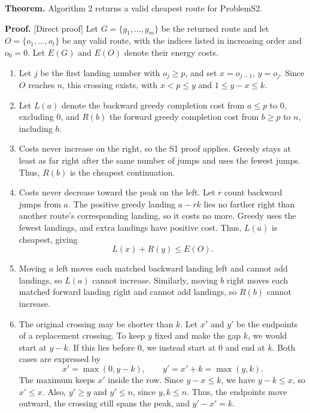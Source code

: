 \documentclass{article}
\begin{document}
\noindent\textbf{Theorem.} Algorithm 2 returns a valid cheapest route for ProblemS2.

\medskip
\noindent\textbf{Proof.} [Direct proof]
Let $G=\{g_1,\ldots,g_m\}$ be the returned route and let $O=\{o_1,\ldots,o_t\}$ be any valid route, with the indices listed in increasing order and $o_0=0$. Let $E(G)$ and $E(O)$ denote their energy costs.

\begin{enumerate}
    \item Let $j$ be the first landing number with $o_j\ge p$, and set $x=o_{j-1}$, $y=o_j$. Since $O$ reaches $n$, this crossing exists, with $x<p\le y$ and $1\le y-x\le k$.

    \item Let $L(a)$ denote the backward greedy completion cost from $a\le p$ to $0$, excluding $0$, and $R(b)$ the forward greedy completion cost from $b\ge p$ to $n$, including $b$.

    \item Costs never increase on the right, so the S1 proof applies. Greedy stays at least as far right after the same number of jumps and uses the fewest jumps. Thus, $R(b)$ is the cheapest continuation.

    \item Costs never decrease toward the peak on the left. Let $r$ count backward jumps from $a$. The positive greedy landing $a-rk$ lies no farther right than another route's corresponding landing, so it costs no more. Greedy uses the fewest landings, and extra landings have positive cost. Thus, $L(a)$ is cheapest, giving
    \[
    L(x)+R(y)\le E(O).
    \]

    \item Moving $a$ left moves each matched backward landing left and cannot add landings, so $L(a)$ cannot increase. Similarly, moving $b$ right moves each matched forward landing right and cannot add landings, so $R(b)$ cannot increase.

    \item The original crossing may be shorter than $k$. Let $x'$ and $y'$ be the endpoints of a replacement crossing. To keep $y$ fixed and make the gap $k$, we would start at $y-k$. If this lies before $0$, we instead start at $0$ and end at $k$. Both cases are expressed by
    \[
    x'=\max(0,y-k),\qquad y'=x'+k=\max(y,k).
    \]
    The maximum keeps $x'$ inside the row. Since $y-x\le k$, we have $y-k\le x$, so $x'\le x$. Also, $y'\ge y$ and $y'\le n$, since $y,k\le n$. Thus, the endpoints move outward, the crossing still spans the peak, and $y'-x'=k$.


\end{enumerate}
\end{document}
